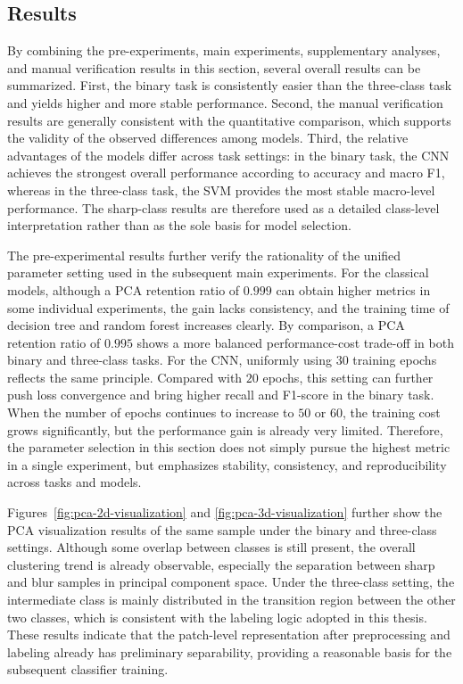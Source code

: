 \subsection{Results}
\par By combining the pre-experiments, main experiments, supplementary analyses,
and manual verification results in this section, several overall results can be
summarized. First, the binary task is consistently easier than the three-class
task and yields higher and more stable performance. Second, the manual
verification results are generally consistent with the quantitative comparison,
which supports the validity of the observed differences among models. Third, the
relative advantages of the models differ across task settings: in the binary
task, the CNN achieves the strongest overall performance according to accuracy
and macro F1, whereas in the three-class task, the SVM provides the most stable
macro-level performance. The sharp-class results are therefore used as a
detailed class-level interpretation rather than as the sole basis for model
selection.

\par The pre-experimental results further verify the rationality of the unified
parameter setting used in the subsequent main experiments. For the classical
models, although a PCA retention ratio of $0.999$ can obtain higher metrics in
some individual experiments, the gain lacks consistency, and the training time
of decision tree and random forest increases clearly. By comparison, a PCA
retention ratio of $0.995$ shows a more balanced performance-cost trade-off in
both binary and three-class tasks. For the CNN, uniformly using $30$ training
epochs reflects the same principle. Compared with $20$ epochs, this setting can
further push loss convergence and bring higher recall and F1-score in the binary
task. When the number of epochs continues to increase to $50$ or $60$, the
training cost grows significantly, but the performance gain is already very
limited. Therefore, the parameter selection in this section does not simply
pursue the highest metric in a single experiment, but emphasizes stability,
consistency, and reproducibility across tasks and models.

\par Figures~\ref{fig:pca-2d-visualization} and \ref{fig:pca-3d-visualization}
further show the PCA visualization results of the same sample under the binary
and three-class settings. Although some overlap between classes is still
present, the overall clustering trend is already observable, especially the
separation between sharp and blur samples in principal component space. Under
the three-class setting, the intermediate class is mainly distributed in the
transition region between the other two classes, which is consistent with the
labeling logic adopted in this thesis. These results indicate that the
patch-level representation after preprocessing and labeling already has
preliminary separability, providing a reasonable basis for the subsequent
classifier training.

